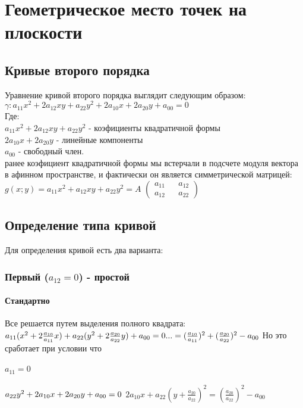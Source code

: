 \documentclass{book}
\begin{document}
\chapter{Геометрическое место точек на плоскости}
\section{Кривые второго порядка}
Уравнение кривой второго порядка выглядит следующим образом:\\
$\gamma:a_{11}x^2+2a_{12}xy+a_{22}y^2+2a_{10}x+2a_{20}y+a_{00}=0$\\
Где:\\
$a_{11}x^2+2a_{12}xy+a_{22}y^2$ - коэфициенты квадратичной формы\\
$2a_{10}x+2a_{20}y$ - линейные компоненты\\
$a_{00}$ - свободный член.\\
ранее коэфициент квадратичной формы мы встерчали в подсчете модуля вектора в афинном пространстве, и фактически он является симметрической матрицей:
$g(x;y)=a_{11}x^2+a_{12}xy+a_{22}y^2=A$
$
\begin{pmatrix}
    {a_{11}} && {a_{12}}\\
    {a_{12}} && {a_{22}}
\end{pmatrix}
$
\section{Определение типа кривой}
Для определения кривой есть два варианта:
\subsection{Первый ($a_{12}=0$) - простой}
\subsubsection{Стандартно}
Все решается путем выделения полного квадрата:
$a_{11}(x^2+2\frac{a_{10}}{a_{11}}x)+a_{22}(y^2+2\frac{a_{20}}{a_{22}}y)+a_{00}=0\\
. . . = (\frac{a_{10}}{a_{11}})^2+(\frac{a_{20}}{a_{22}})^2-a_{00}\\$
Но это сработает при условии что 
\subsubsection{$a_{11}=0$}
$a_{22}y^2+2a_{10}x+2a_{20}y+a_{00}=0\\$
$2a_{10}x+a_{22}(y+\frac{a_{20}}{a_{22}})^2=(\frac{a_{20}}{a_{22}})^2-a_{00}$
\end{document}
